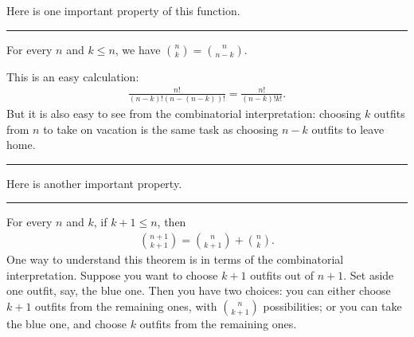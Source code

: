 \documentclass[letterpaper,10pt,english]{sphinxmanual}
\begin{document}
\sphinxAtStartPar
Here is one important property of this function.


\bigskip\hrule\bigskip


\sphinxAtStartPar
{} For every \(n\) and \(k \leq n\), we have \(\binom{n}{k} = \binom{n}{n - k}\).

\sphinxAtStartPar
{} This is an easy calculation:
\begin{equation*}
\begin{split}\frac{n!}{(n - k)! (n - (n - k))!} = \frac{n!}{(n - k)! k!}.\end{split}
\end{equation*}
\sphinxAtStartPar
But it is also easy to see from the combinatorial interpretation: choosing \(k\) outfits from \(n\) to take on vacation is the same task as choosing \(n - k\) outfits to leave home.


\bigskip\hrule\bigskip


\sphinxAtStartPar
Here is another important property.


\bigskip\hrule\bigskip


\sphinxAtStartPar
{} For every \(n\) and \(k\), if \(k + 1 \leq n\),
then
\begin{equation*}
\begin{split}\binom{n+1}{k+1} = \binom{n}{k+1} + \binom{n}{k}.\end{split}
\end{equation*}
\sphinxAtStartPar
{} One way to understand this theorem is in terms of the combinatorial interpretation. Suppose you want to choose \(k+1\) outfits out of \(n + 1\). Set aside one outfit, say, the blue one. Then you have two choices: you can either choose \(k+1\) outfits from the remaining ones, with \(\binom{n}{k+1}\) possibilities; or you can take the blue one, and choose \(k\) outfits from the remaining ones.
\end{document}
